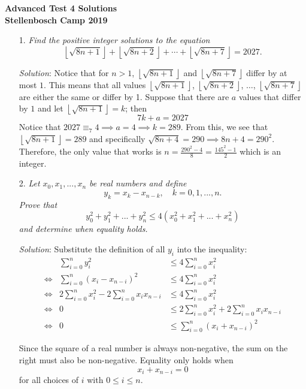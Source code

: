 \documentclass{article}
\begin{document}
\begin{center}
  \textbf{\Large Advanced Test 4 Solutions}
  \\ \vspace{1em}
  \textbf{\large Stellenbosch Camp 2019}
\end{center}

\vspace{12pt}


\begin{enumerate}

\item[1.] %
\newcommand{\floorsqrt}[1]{\left\lfloor\sqrt{#1}\right\rfloor} 
\textit{
Find the positive integer solutions to the equation
\[ \floorsqrt{8n+1} +\floorsqrt{8n+2} +\dotsb +\floorsqrt{8n+7} = 2027. \]}

\textit{Solution}:
Notice that for $n > 1$, $\floorsqrt{8n + 1}$ and $\floorsqrt{8n + 7}$ differ by at most $1$.
This means that all values $\floorsqrt{8n + 1}$, $\floorsqrt{8n + 2}$, $\dots$, $\floorsqrt{8n + 7}$ are either the same or differ by 1.
Suppose that there are $a$ values that differ by $1$ and let $\floorsqrt{8n + 1} = k$; then
\[ 7k + a = 2027 \]
Notice that $2027 \equiv _7 4 \implies a = 4 \implies k = 289$.
From this, we see that $\floorsqrt{8n + 1} = 289$ and specifically $\sqrt{8n + 4} = 290 \implies 8n + 4 = 290^2$.
Therefore, the only value that works is $n = \frac{290^2 - 4}{8} = \frac{145^2 - 1}{2}$ which is an integer.


\item[2.] %
\textit{
Let $x_0, x_1,..., x_n$ be real numbers and define
\[y_k=x_k-x_{n-k}, \quad k=0,1,...,n.\]
Prove that 
\[y_0^2 + y_1^2+...+ y_n^2 \leq 4(x_0^2 + x_1^2 + ... + x_n^2) \]
and determine when equality holds.
}

\textit{Solution}: 
Substitute the definition of all $y_i$ into the inequality:
\begin{align*}
  &&\sum_{i=0}^{n}y_i^2 &\leq 4\sum_{i=0}^{n}x_i^2 &\\
  &\iff& \sum_{i=0}^{n}(x_i - x_{n-i})^2 &\leq 4\sum_{i=0}^{n}x_i^2 &\\
  &\iff& 2\sum_{i=0}^{n}x_i^2 - 2\sum_{i=0}^{n}x_ix_{n-i} &\leq 4\sum_{i=0}^{n}x_i^2& \\
  &\iff& 0 &\leq 2\sum_{i=0}^{n}x_i^2 + 2\sum_{i=0}^{n}x_ix_{n-i} \\
  &\iff& 0 &\leq \sum_{i=0}^{n}(x_i + x_{n-i})^2 &
\end{align*}

Since the square of a real number is always non-negative, the sum on the right must also be non-negative.
Equality only holds when
$$x_i + x_{n-i} = 0$$
for all choices of $i$ with $0 \leq i \leq n$.



\end{enumerate}
\end{document}
